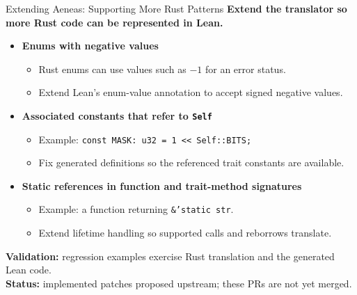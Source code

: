 \documentclass[aspectratio=169,xcolor=dvipsnames]{beamer}
\begin{document}
\begin{frame}{Extending Aeneas: Supporting More Rust Patterns}
    \small
    \textbf{Extend the translator so more Rust code can be represented in Lean.}
    \begin{itemize}
        \item \textbf{Enums with negative values}
        \begin{itemize}
            \item Rust enums can use values such as $-1$ for an error status.
            \item Extend Lean's enum-value annotation to accept signed negative values.
        \end{itemize}
        \item \textbf{Associated constants that refer to \texttt{Self}}
        \begin{itemize}
            \item Example: \texttt{const MASK: u32 = 1 << Self::BITS;}
            \item Fix generated definitions so the referenced trait constants are available.
        \end{itemize}
        \item \textbf{Static references in function and trait-method signatures}
        \begin{itemize}
            \item Example: a function returning \texttt{\&'static str}.
            \item Extend lifetime handling so supported calls and reborrows translate.
        \end{itemize}
    \end{itemize}
    \medskip
    \footnotesize
    \textbf{Validation:} regression examples exercise Rust translation and the generated Lean code.\\[3pt]
    \textbf{Status:} implemented patches proposed upstream; these PRs are not yet merged.
\end{frame}
\end{document}
